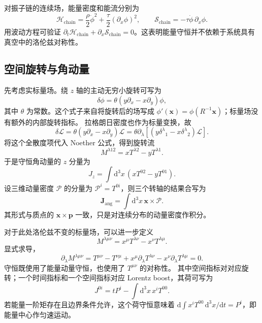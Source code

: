 对振子链的连续场，能量密度和能流分别为
\begin{equation}
  \mathcal{H}_{\mathrm{chain}}=\frac{\rho}{2}\dot\phi^{2}
  +\frac{\tau}{2}(\partial_{x}\phi)^{2},\qquad
  \mathcal{S}_{\mathrm{chain}}=-\tau\dot\phi\,\partial_{x}\phi.
\end{equation}
用波动方程可验证 $\partial_{t}\mathcal{H}_{\mathrm{chain}}
+\partial_{x}\mathcal{S}_{\mathrm{chain}}=0$。这表明能量守恒并不依赖于系统具有真空中的洛伦兹对称性。

\subsection{空间旋转与角动量}

先考虑实标量场。绕 $z$ 轴的主动无穷小旋转可写为
\begin{equation}
  \delta\phi=\theta(y\partial_{x}-x\partial_{y})\phi,
\end{equation}
其中 $\theta$ 为常数。这个式子来自将旋转后的场写成
$\phi'(\bm{x})=\phi(R^{-1}\bm{x})$；标量场没有额外的内部旋转指标。
拉格朗日密度也作为标量变换，故
\begin{equation}
  \delta\mathcal{L}=\theta(y\partial_{x}-x\partial_{y})\mathcal{L}
  =\theta\partial_{\lambda}
  \left[(y\delta^{\lambda}{}_{1}-x\delta^{\lambda}{}_{2})\mathcal{L}\right].
\end{equation}
将这个全散度项代入 Noether 公式，得到旋转流
\begin{equation}
  M^{\lambda12}=xT^{\lambda2}-yT^{\lambda1}.
\end{equation}
于是守恒角动量的 $z$ 分量为
\begin{equation}
  J_{z}=\int\mathrm{d}^{3}x\,(xT^{02}-yT^{01}).
\end{equation}
设三维动量密度 $\bm{\mathcal{P}}$ 的分量为
$\mathcal{P}^{i}=T^{0i}$，则三个转轴的结果合写为
\begin{equation}
  \bm{J}_{\mathrm{ang}}=\int\mathrm{d}^{3}x\,
  \bm{x}\times\bm{\mathcal{P}}.
\end{equation}
其形式与质点的 $\bm{x}\times\bm{p}$ 一致，只是对连续分布的动量密度作积分。

对于此处洛伦兹不变的标量场，可以进一步定义
\begin{equation}
  M^{\lambda\mu\nu}=x^{\mu}T^{\lambda\nu}-x^{\nu}T^{\lambda\mu}.
  \label{eq:prelude-lorentz-current}
\end{equation}
显式求导，
\begin{equation}
  \partial_{\lambda}M^{\lambda\mu\nu}
  =T^{\mu\nu}-T^{\nu\mu}
  +x^{\mu}\partial_{\lambda}T^{\lambda\nu}
  -x^{\nu}\partial_{\lambda}T^{\lambda\mu}=0.
\end{equation}
守恒既使用了能量动量守恒，也使用了 $T^{\mu\nu}$ 的对称性。
其中空间指标对对应旋转；一个时间指标和一个空间指标对应 Lorentz boost，其荷可写为
\begin{equation}
  J^{0i}=tP^{i}-\int\mathrm{d}^{3}x\,x^{i}T^{00}.
\end{equation}
若能量一阶矩存在且边界条件允许，这个荷守恒意味着
$\mathrm{d}\int x^{i}T^{00}\,\mathrm{d}^{3}x/\mathrm{d}t=P^{i}$，即能量中心作匀速运动。

